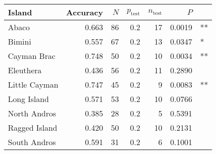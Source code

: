 
\begin{tabular}{lrrrrrl}
\toprule
Island & Accuracy & $N$ & $p_{\mbox{test}}$ & $n_{\mbox{test}}$ & $P$ & \\
\midrule
Abaco & 0.663 & 86 & 0.2 & 17 & 0.0019 & **\\
Bimini & 0.557 & 67 & 0.2 & 13 & 0.0347 & *\\
Cayman Brac & 0.748 & 50 & 0.2 & 10 & 0.0034 & **\\
Eleuthera & 0.436 & 56 & 0.2 & 11 & 0.2890 & \\
Little Cayman & 0.747 & 45 & 0.2 & 9 & 0.0083 & **\\
Long Island & 0.571 & 53 & 0.2 & 10 & 0.0766 & \\
North Andros & 0.385 & 28 & 0.2 & 5 & 0.5391 & \\
Ragged Island & 0.420 & 50 & 0.2 & 10 & 0.2131 & \\
South Andros & 0.591 & 31 & 0.2 & 6 & 0.1001 & \\
\bottomrule
\end{tabular}
